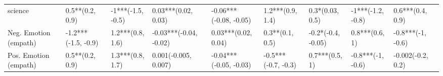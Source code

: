 \begin{tabular}{lllllllll}
science               &      0.5**(0.2, 0.9) &  -1***(-1.5, -0.5) &      0.03***(0.02, 0.03) &  -0.06***(-0.08, -0.05) &     1.2***(0.9, 1.4) &      0.3*(0.03, 0.5) &    -1***(-1.2, -0.8) &     0.6***(0.4, 0.9) \\
Neg. Emotion (empath) &  -1.2***(-1.5, -0.9) &   1.2***(0.8, 1.6) &   -0.03***(-0.04, -0.02) &     0.03***(0.02, 0.04) &      0.3**(0.1, 0.5) &   -0.2*(-0.4, -0.05) &       0.8***(0.6, 1) &    -0.8***(-1, -0.6) \\
Pos. Emotion (empath) &      0.5**(0.2, 0.9) &   1.3***(0.8, 1.7) &     0.001(-0.005, 0.007) &  -0.04***(-0.05, -0.03) &  -0.5***(-0.7, -0.3) &       0.7***(0.5, 1) &    -0.8***(-1, -0.6) &    -0.002(-0.2, 0.2) \\
\bottomrule
\end{tabular}
